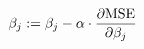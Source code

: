 \documentclass[preview]{standalone}
\begin{document}
\begin{align*}
\special{dvisvgm:raw <g id='unique000'>}\beta_j := \beta_j - \alpha \cdot \frac{\partial \text{MSE}}{\partial \beta_j}\special{dvisvgm:raw </g>}
\end{align*}
\end{document}
